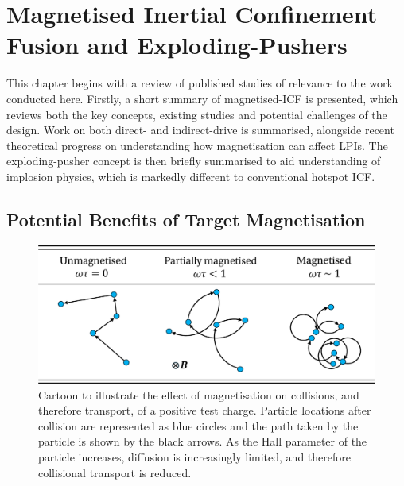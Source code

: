 \newpage

\section{Magnetised Inertial Confinement Fusion and Exploding-Pushers}%
\label{sec:Res2_MagICF}

This chapter begins with a review of published studies of relevance to the work conducted here.
Firstly, a short summary of magnetised-\ac{ICF} is presented, which reviews both the key concepts, existing studies and potential challenges of the design.
Work on both direct- and indirect-drive is summarised, alongside recent theoretical progress on understanding how magnetisation can affect \ac{LPIs}.
The exploding-pusher concept is then briefly summarised to aid understanding of implosion physics, which is markedly different to conventional hotspot \ac{ICF}.

\subsection{Potential Benefits of Target Magnetisation}%
\label{sec:Res2_magbenefits}

\begin{figure}[t!]
    \includegraphics[width=0.75\linewidth]{Results2/Images/wt_collisions.png}
    \centering
    \caption{Cartoon to illustrate the effect of magnetisation on collisions, and therefore transport, of a positive test charge.
    Particle locations after collision are represented as blue circles and the path taken by the particle is shown by the black arrows.
    As the Hall parameter of the particle increases, diffusion is increasingly limited, and therefore collisional transport is reduced.}%
    \label{fig:Res2_omegatau}
\end{figure}

